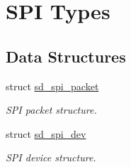 \hypertarget{group___s_d___s_p_i___types}{}\section{S\+PI Types}
\label{group___s_d___s_p_i___types}
\subsection*{Data Structures}
\begin{DoxyCompactItemize}
\item 
struct \mbox{\hyperlink{structsd__spi__packet}{sd\+\_\+spi\+\_\+packet}}
\begin{DoxyCompactList}\small\item\em S\+PI packet structure. \end{DoxyCompactList}\item 
struct \mbox{\hyperlink{structsd__spi__dev}{sd\+\_\+spi\+\_\+dev}}
\begin{DoxyCompactList}\small\item\em S\+PI device structure. \end{DoxyCompactList}\end{DoxyCompactItemize}
